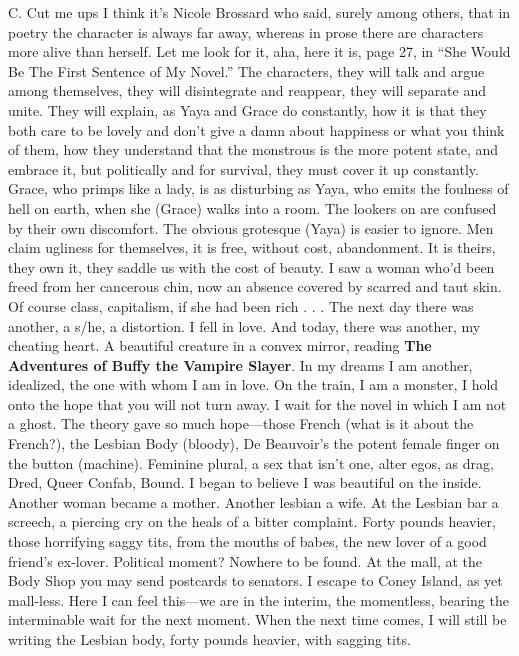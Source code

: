 C. Cut me ups I think it's Nicole Brossard who said, surely among
others, that in poetry the character is always far away, whereas in
prose there are characters more alive than herself. Let me look for it,
aha, here it is, page 27, in ``She Would Be The First Sentence of My
Novel.'' The characters, they will talk and argue among themselves, they
will disintegrate and reappear, they will separate and unite. They will
explain, as Yaya and Grace do constantly, how it is that they both care
to be lovely and don't give a damn about happiness or what you think of
them, how they understand that the monstrous is the more potent state,
and embrace it, but politically and for survival, they must cover it up
constantly. Grace, who primps like a lady, is as disturbing as Yaya, who
emits the foulness of hell on earth, when she (Grace) walks into a room.
The lookers on are confused by their own discomfort. The obvious
grotesque (Yaya) is easier to ignore. Men claim ugliness for themselves,
it is free, without cost, abandonment. It is theirs, they own it, they
saddle us with the cost of beauty. I saw a woman who'd been freed from
her cancerous chin, now an absence covered by scarred and taut skin. Of
course class, capitalism, if she had been rich . . . The next day there
was another, a s/he, a distortion. I fell in love. And today, there was
another, my cheating heart. A beautiful creature in a convex mirror,
reading \textbf{The Adventures of Buffy the Vampire Slayer}. In my
dreams I am another, idealized, the one with whom I am in love. On the
train, I am a monster, I hold onto the hope that you will not turn away.
I wait for the novel in which I am not a ghost. The theory gave so much
hope---those French (what is it about the French?), the Lesbian Body
(bloody), De Beauvoir's the potent female finger on the button
(machine). Feminine plural, a sex that isn't one, alter egos, as drag,
Dred, Queer Confab, Bound. I began to believe I was beautiful on the
inside. Another woman became a mother. Another lesbian a wife. At the
Lesbian bar a screech, a piercing cry on the heals of a bitter
complaint. Forty pounds heavier, those horrifying saggy tits, from the
mouths of babes, the new lover of a good friend's ex-lover. Political
moment? Nowhere to be found. At the mall, at the Body Shop you may send
postcards to senators. I escape to Coney Island, as yet mall-less. Here
I can feel this---we are in the interim, the momentless, bearing the
interminable wait for the next moment. When the next time comes, I will
still be writing the Lesbian body, forty pounds heavier, with sagging
tits.

